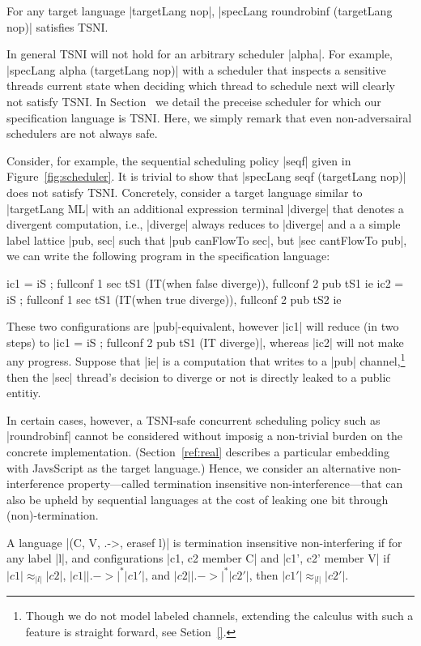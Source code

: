 \begin{theorem}
  \label{thm:rr-tsni}
For any target language |targetLang nop|, |specLang roundrobinf
(targetLang nop)| satisfies TSNI.
\end{theorem}

In general TSNI will not hold for an arbitrary scheduler |alpha|.
%
For example, |specLang alpha (targetLang nop)| with a scheduler that inspects a
sensitive threads current state when deciding which thread to schedule next
will clearly not satisfy TSNI.
%
In Section~\toref{} we detail the preceise scheduler for which our
specification language is TSNI.
%
Here, we simply remark that even non-adversairal schedulers are not always safe.

Consider, for example, the sequential scheduling policy |seqf| given in
Figure~\ref{fig:scheduler}.
%
It is trivial to show that |specLang seqf (targetLang nop)| does not satisfy
TSNI.
%
Concretely, consider a target language similar to |targetLang ML| with an
additional expression terminal |diverge| that denotes a divergent computation,
i.e., |diverge| always reduces to |diverge| and a a simple label lattice |{pub,
sec}| such that |pub canFlowTo sec|, but |sec cantFlowTo pub|, we can write the
following program in the specification language:
\begin{code}
ic1 = iS ; fullconf 1 sec tS1 (IT(when false diverge)),  fullconf 2 pub tS1 ie
ic2 = iS ; fullconf 1 sec tS1 (IT(when true diverge)),   fullconf 2 pub tS2 ie
\end{code}
These two configurations are |pub|-equivalent, however |ic1| will reduce (in two
steps) to |ic1 = iS ; fullconf 2 pub tS1 (IT diverge)|, whereas |ic2| will not make
any progress.
%
Suppose that |ie| is a computation that writes to a |pub| channel,\footnote{
Though we do not model labeled channels, extending the calculus with such a
feature is straight forward, see Setion~\ref{}.
} then the |sec| thread's decision to diverge or not is directly leaked to a
public entitiy.

In certain cases, however, a TSNI-safe concurrent scheduling policy such as
|roundrobinf| cannot be considered without imposig a non-trivial burden on the
concrete implementation.
%
(Section~\ref{ref:real} describes a particular embedding with JavsScript as the
target language.)
%
Hence, we consider an alternative non-interference property---called termination insensitive
non-interference---that can also be upheld by sequential languages at the cost
of leaking one bit through (non)-termination.
%
\begin{definition}
  A language |(C, V, .->, erasef l)| is termination
  insensitive non-interfering if for any label |l|, and configurations
  |c1, c2 member C| and |c1', c2' member V| if
   $|c1| \approx_{|l|} |c2|$,
   $|c1| |.->|^* |c1'|$, and
   $|c2| |.->|^* |c2'|$, then
   $|c1'| \approx_{|l|} |c2'|$.
\end{definition}

